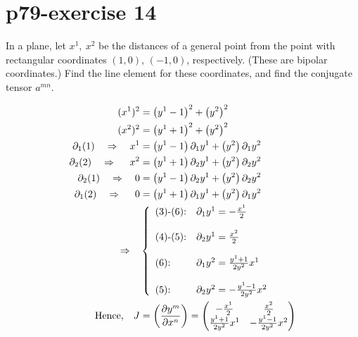 \section{p79-exercise 14}
\begin{tcolorbox}
In a plane, let $x^1, \  x^2$ be the distances of a general point from the point with rectangular coordinates $(1,0)$, $(-1,0)$, respectively. (These are bipolar coordinates.) Find the line element for these coordinates, and find the conjugate tensor $a^{mn}$.
\end{tcolorbox}
\begin{figure}[h]


\end{figure}
\begin{align}
\ (x^1)^2 &= \left( y^1-1\right) ^2 + \left(y^2\right)^2\\
\ (x^2)^2 &= \left( y^1+1\right) ^2 + \left(y^2\right)^2\\
\partial_1 (1) \quad\Rightarrow \quad x^1 &= \left( y^1-1\right)\partial_1 y^1  + \left(y^2\right)\partial_1 y^2\\
\partial_2 (2) \quad\Rightarrow \quad\ x^2 &= \left( y^1+1\right)\partial_2 y^1  + \left(y^2\right)\partial_2 y^2\\
\partial_2 (1) \quad\Rightarrow \quad 0 &= \left( y^1-1\right)\partial_2 y^1  + \left(y^2\right)\partial_2 y^2\\
\partial_1 (2) \quad\Rightarrow \quad\ 0 &= \left( y^1+1\right)\partial_1 y^1  + \left(y^2\right)\partial_1 y^2\\
\Rightarrow \quad & \left\{\begin{array}{ll}
\text{(3)-(6):}& \partial_1 y^1 = -\frac{x^1}{2}\\\\
\text{(4)-(5):}& \partial_2 y^1 = \frac{x^2}{2}\\\\
\text{(6):}& \partial_1 y^2 = \frac{y^1+1}{2y^2}x^1\\\\
\text{(5):}& \partial_2 y^2 = -\frac{y^1-1}{2y^2}x^2\\
\end{array}\right.\\
\text{Hence,}\quad J &= \left(\pdv{y^m}{x^n} \right) = \begin{pmatrix}
-\frac{x^1}{2} &\frac{x^2}{2}  \\
\frac{y^1+1}{2y^2}x^1 & -\frac{y^1-1}{2y^2}x^2 \\
\end{pmatrix}
\end{align}
